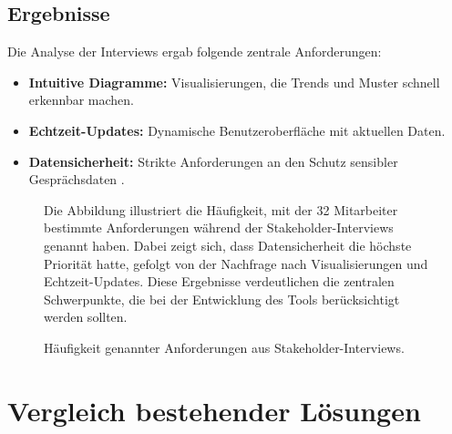 \subsection{Ergebnisse}
Die Analyse der Interviews ergab folgende zentrale Anforderungen:
\begin{itemize}
    \item \textbf{Intuitive Diagramme:} Visualisierungen, die Trends und Muster schnell erkennbar machen.
    \item \textbf{Echtzeit-Updates:} Dynamische Benutzeroberfläche mit aktuellen Daten.
    \item \textbf{Datensicherheit:} Strikte Anforderungen an den Schutz sensibler Gesprächsdaten \cite{bryson2011employee}.
\end{itemize}

\begin{figure}[h!]
    \centering
    Die Abbildung illustriert die Häufigkeit, mit der 32 Mitarbeiter bestimmte Anforderungen während der Stakeholder-Interviews genannt haben. Dabei zeigt sich, dass Datensicherheit die höchste Priorität hatte, gefolgt von der Nachfrage nach Visualisierungen und Echtzeit-Updates. Diese Ergebnisse verdeutlichen die zentralen Schwerpunkte, die bei der Entwicklung des Tools berücksichtigt werden sollten.
    
    \caption{Häufigkeit genannter Anforderungen aus Stakeholder-Interviews.}
    \label{fig:stakeholder_results_barchart}
\end{figure}
\newpage

\section{Vergleich bestehender Lösungen}
